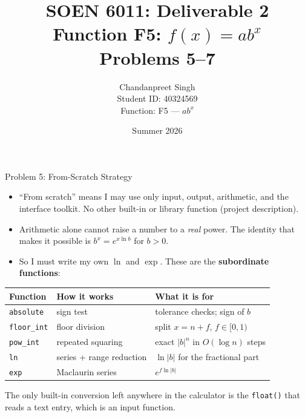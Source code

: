 \documentclass[11pt]{beamer}
\title[D2]{SOEN 6011: Deliverable 2 \\ Function F5: $f(x) = ab^{x}$ \\ Problems 5--7}
\author[C. Singh --- 40324569]{Chandanpreet Singh \\ Student ID: 40324569 \\ Function: F5 --- $ab^{x}$}
\date{Summer 2026}
\begin{document}
\begin{frame}
  \titlepage
\end{frame}

\begin{frame}{Problem 5: From-Scratch Strategy}
  \begin{itemize}
    \item ``From scratch'' means I may use only input, output, arithmetic,
          and the interface toolkit. No other built-in or library function
          (project description).
    \item Arithmetic alone cannot raise a number to a \emph{real} power.
          The identity that makes it possible is $b^{x} = e^{x \ln b}$ for $b > 0$.
    \item So I must write my own $\ln$ and $\exp$. These are the
          \textbf{subordinate functions}:
  \end{itemize}
  \medskip
  \centering
  \begin{tabular}{lll}
    \toprule
    Function & How it works & What it is for \\
    \midrule
    \texttt{absolute}   & sign test                & tolerance checks; sign of $b$ \\
    \texttt{floor\_int} & floor division           & split $x = n + f$, $f \in [0,1)$ \\
    \texttt{pow\_int}   & repeated squaring        & exact $|b|^{n}$ in $O(\log n)$ steps \\
    \texttt{ln}         & series + range reduction & $\ln|b|$ for the fractional part \\
    \texttt{exp}        & Maclaurin series         & $e^{f \ln|b|}$ \\
    \bottomrule
  \end{tabular}
  \medskip

  {\footnotesize The only built-in conversion left anywhere in the calculator
  is the \texttt{float()} that reads a text entry, which is an input function.}
\end{frame}
\end{document}
